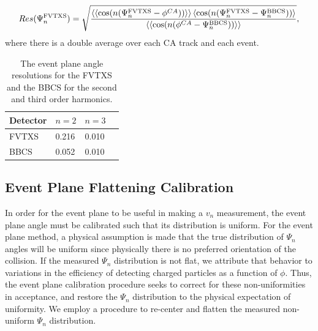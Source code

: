 \begin{equation}
Res(\Psi_n^{\rm FVTXS}) = \sqrt{\frac{\left<\left<\cos(n(\Psi_n^{\rm FVTXS} - \phi^{CA}))\right>\right>\left<\cos(n(\Psi_n^{\rm FVTXS} - \Psi_n^{\rm BBCS}))\right>}{\left<\left<\cos(n(\phi^{CA} - \Psi_n^{\rm BBCS}))\right>\right>}},
\end{equation}
where there is a double average over each CA track and each event.
\begin{table}[!ht]
\caption{The event plane angle resolutions for the FVTXS and the BBCS for the second and third order harmonics.}
\begin{center}
    \begin{tabular}{| l | l | l | l |}
    \hline
    Detector & $n=2$ & $n=3$  \\ \hline
    FVTXS & 0.216 & 0.010 \\ \hline
    BBCS & 0.052 & 0.010  \\ \hline
    \end{tabular}
\end{center}
\label{tbl:std_resolutions}
\end{table}

\subsection{Event Plane Flattening Calibration}
In order for the event plane to be useful in making a $v_n$ measurement, the event plane angle must be calibrated such that its distribution is uniform. For the event plane method, a physical assumption is made that the true distribution of $\Psi_n$ angles will be uniform since physically there is no preferred orientation of the collision. If the measured $\Psi_n$ distribution is not flat, we attribute that behavior to variations in the efficiency of detecting charged particles as a function of $\phi$. Thus, the event plane calibration procedure seeks to correct for these non-uniformities in acceptance, and restore the $\Psi_n$ distribution to the physical expectation of uniformity. We employ a procedure to re-center and flatten the measured non-uniform $\Psi_n$ distribution.

